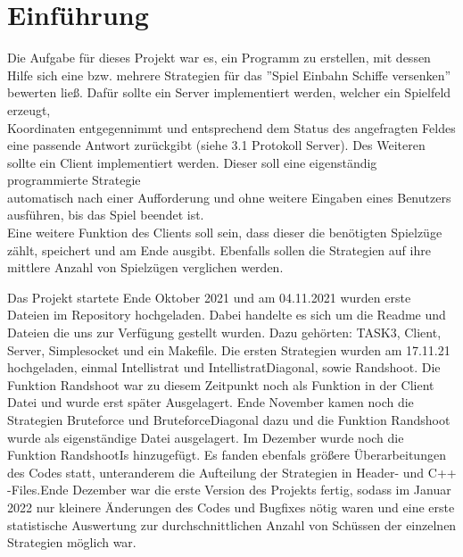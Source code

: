\section{Einführung}

Die Aufgabe für dieses Projekt war es, ein Programm zu erstellen, mit dessen Hilfe sich eine bzw. mehrere Strategien für das ''Spiel Einbahn Schiffe versenken'' bewerten ließ. Dafür 
sollte 
ein Server implementiert werden, welcher ein Spielfeld erzeugt,\\ Koordinaten entgegennimmt und entsprechend dem Status des angefragten Feldes eine passende Antwort zurückgibt (siehe 3.1 Protokoll Server). 
Des Weiteren sollte ein Client implementiert werden.
Dieser soll eine eigenständig programmierte Strategie \\
automatisch nach einer Aufforderung und ohne weitere Eingaben eines Benutzers ausführen, bis das Spiel beendet ist. \\
Eine weitere Funktion des Clients soll sein, dass dieser die benötigten Spielzüge zählt, speichert und am Ende ausgibt. Ebenfalls sollen die 
Strategien auf ihre mittlere Anzahl von Spielzügen verglichen werden.\newline

Das Projekt startete Ende Oktober 2021 und am 04.11.2021 wurden erste Dateien im Repository hochgeladen.\newline
Dabei handelte es sich um die Readme und Dateien die uns zur Verfügung gestellt wurden.
Dazu gehörten: TASK3, Client, Server, Simplesocket und ein Makefile.\newline
\newline
Die ersten Strategien wurden am 17.11.21 hochgeladen, einmal Intellistrat und \newline IntellistratDiagonal, sowie Randshoot.
Die Funktion Randshoot war zu diesem Zeitpunkt noch als Funktion in der Client Datei und wurde erst später Ausgelagert.\newline
\newline
Ende November kamen noch die Strategien Bruteforce und BruteforceDiagonal dazu und die Funktion Randshoot wurde als eigenständige Datei ausgelagert.\newline
\newline
Im Dezember wurde noch die Funktion RandshootIs hinzugefügt. Es fanden ebenfals größere Überarbeitungen des Codes statt, unteranderem die Aufteilung der Strategien in Header- und C++ 
-Files.\newline Ende Dezember war die erste Version des Projekts fertig, sodass im Januar 2022 nur kleinere Änderungen des Codes und Bugfixes nötig waren und eine erste statistische 
Auswertung zur durchschnittlichen Anzahl von Schüssen der einzelnen Strategien möglich war. 

